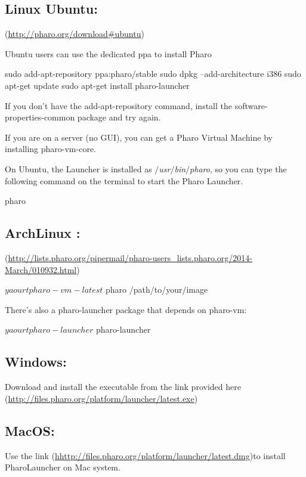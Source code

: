 \documentclass[a4paper,10pt,twoside]{book}
\begin{document}
\subsection{Linux Ubuntu:}
(\url{http://pharo.org/download#ubuntu})

Ubuntu users can use the dedicated ppa to install Pharo


\begin{code}{}
sudo add-apt-repository ppa:pharo/stable
sudo dpkg --add-architecture i386
sudo apt-get update
sudo apt-get install pharo-launcher
\end{code}


If you don't have the add-apt-repository command, install the software-properties-common package and try again.

If you are on a server (no GUI), you can get a Pharo Virtual Machine by installing pharo-vm-core.

On Ubuntu, the Launcher is installed as \textit{$/$usr$/$bin$/$pharo}, so you can type the following command on the terminal to start the Pharo Launcher.

\begin{code}{}
pharo 
\end{code}
 
\subsection{ArchLinux :}
(\url{http://lists.pharo.org/pipermail/pharo-users_lists.pharo.org/2014-March/010932.html})


\begin{code}{}
$ yaourt pharo-vm-latest
$ pharo /path/to/your/image
\end{code}


There's also a pharo-launcher package that depends on pharo-vm:

\begin{code}{}
$ yaourt pharo-launcher
$ pharo-launcher
\end{code}

\subsection{Windows:}
Download and install the executable from the link provided here (\url{http://files.pharo.org/platform/launcher/latest.exe})
\subsection{MacOS:}
Use the link (\url{hhttp://files.pharo.org/platform/launcher/latest.dmg})to install PharoLauncher on Mac system.
\end{document}
